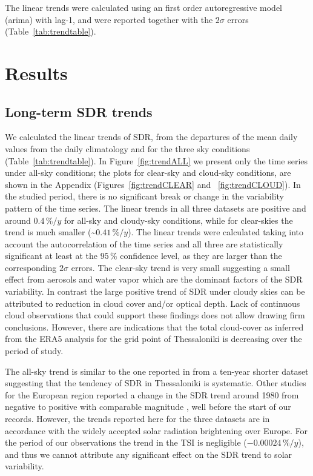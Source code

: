 \documentclass[applsci,article,submit,moreauthors,pdftex]{Definitions/mdpi}
\begin{document}
The linear trends were calculated using an first order autoregressive
model (arima) with lag-1, and were reported together with the
\(2\sigma\) errors (Table~\ref{tab:trendtable}).

\citet{Santer2000}

\hypertarget{results}{%
\section{Results}\label{results}}

\hypertarget{long-term-sdr-trends}{%
\subsection{Long-term SDR trends}\label{long-term-sdr-trends}}

We calculated the linear trends of SDR, from the departures of the mean
daily values from the daily climatology and for the three sky conditions
(Table~\ref{tab:trendtable}). In Figure~\ref{fig:trendALL} we present
only the time series under all-sky conditions; the plots for clear-sky
and cloud-sky conditions, are shown in the Appendix
(Figures~\ref{fig:trendCLEAR} and~ \ref{fig:trendCLOUD}). In the studied
period, there is no significant break or change in the variability
pattern of the time series. The linear trends in all three datasets are
positive and around \(0.4\,\%/y\) for all-sky and cloudy-sky conditions,
while for clear-skies the trend is much smaller
(\textasciitilde{}\(0.41\,\%/y\)). The linear trends were calculated
taking into account the autocorrelation of the time series and all three
are statistically significant at least at the \(95\,\%\) confidence
level, as they are larger than the corresponding \(2\sigma\) errors. The
clear-sky trend is very small suggesting a small effect from aerosols
and water vapor which are the dominant factors of the SDR variability.
In contrast the large positive trend of SDR under cloudy skies can be
attributed to reduction in cloud cover and/or optical depth. Lack of
continuous cloud observations that could support these findings does not
allow drawing firm conclusions. However, there are indications that the
total cloud-cover as inferred from the ERA5 analysis for the grid point
of Thessaloniki is decreasing over the period of study.

The all-sky trend is similar to the one reported in \citet{Bais2013}
from a ten-year shorter dataset suggesting that the tendency of SDR in
Thessaloniki is systematic. Other studies for the European region
reported a change in the SDR trend around 1980 from negative to positive
with comparable magnitude \citep{Wild2021, Yuan2021, Ohmura2009}, well
before the start of our records. However, the trends reported here for
the three datasets are in accordance with the widely accepted solar
radiation brightening over Europe. For the period of our observations
the trend in the TSI is negligible (\(-0.00024\,\%/y\)), and thus we
cannot attribute any significant effect on the SDR trend to solar
variability.
\end{document}

